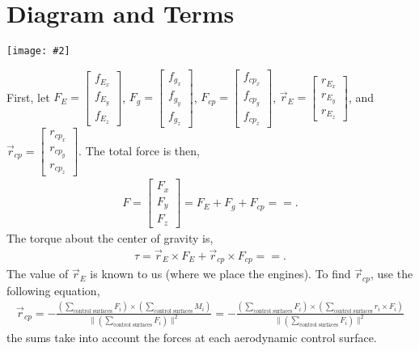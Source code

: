 \documentclass[11pt]{article}
\newcommand{\img}[2]{\begin{center}\texttt{[image: \#2]}\end{center}}
\newcommand{\mathse}[1]{\begin{gather*}#1\end{gather*}}
\newcommand{\norm}[1]{\lVert#1\rVert}
\newcommand{\mat}[1]{\begin{bmatrix} #1 \end{bmatrix}}
\newcommand{\sinput}[1]{}
\begin{document}
\section{Diagram and Terms}
\img{0.99}{diagram.png}

First, let $F_E = \mat{f_{E_x} \\ f_{E_y} \\ f_{E_z}}$, $F_g = \mat{f_{g_x} \\ f_{g_y} \\ f_{g_z}}$, $F_{cp} = \mat{f_{cp_x} \\ f_{cp_y} \\ f_{cp_z}}$, $\vec{r}_E = \mat{r_{E_x} \\ r_{E_y} \\ r_{E_z}}$, and $\vec{r}_{cp} = \mat{r_{cp_x} \\ r_{cp_y} \\ r_{cp_z}}$. The total force is then,
\mathse{
    F = \mat{F_x\\ F_y\\ F_z} = F_E + F_g + F_{cp} = \sinput{F} = \sinput{F_subbed}.
}
The torque about the center of gravity is,
\mathse{
    \tau = \vec{r}_E \times F_E + \vec{r}_{cp} \times F_{cp} = \sinput{tau} = \sinput{tau_subbed}.
}
The value of $\vec{r}_E$ is known to us (where we place the engines). To find $\vec{r}_{cp}$, use the following equation,
\mathse{
    \vec{r}_{cp} = -\frac{\left(\sum_{\text{control surfaces}} F_i\right)\times \left(\sum_{\text{control surfaces}} M_i\right)}{\norm{\left(\sum_{\text{control surfaces}} F_i\right)}^2} = -\frac{\left(\sum_{\text{control surfaces}} F_i\right)\times \left(\sum_{\text{control surfaces}} r_i\times F_i\right)}{\norm{\left(\sum_{\text{control surfaces}} F_i\right)}^2}
}
the sums take into account the forces at each aerodynamic control surface. 
\end{document}
